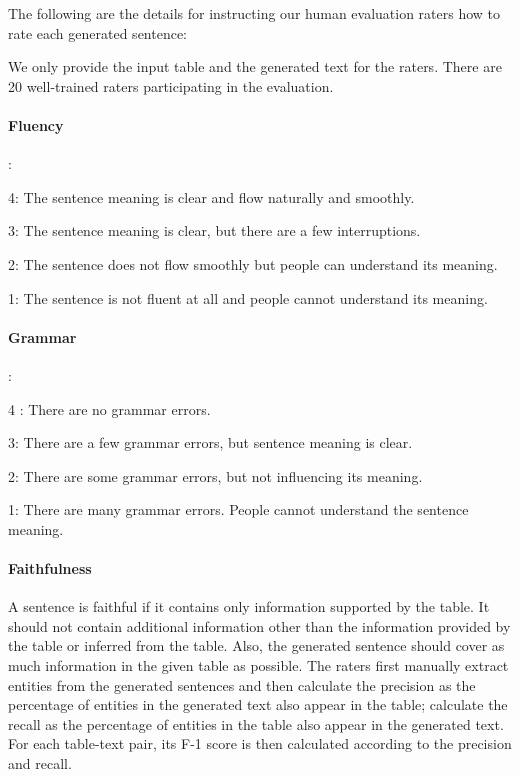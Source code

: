 \documentclass[11pt,a4paper]{article}
\begin{document}
The following are the details for instructing our human evaluation raters how to rate each generated sentence:

We only provide the input table and the generated text for the raters. There are 20 well-trained raters participating in the evaluation.

\paragraph{Fluency}:

4: The sentence meaning is clear and flow naturally and smoothly.

3: The sentence meaning is clear, but there are a few interruptions.

2: The sentence does not flow smoothly but people can understand its meaning.

1: The sentence is not fluent at all and people cannot understand its meaning.


\paragraph{Grammar}:

4 : There are no grammar errors.

3:  There are a few grammar errors, but sentence meaning is clear.

2:  There are some grammar errors, but not influencing its meaning.

1:  There are many grammar errors. People cannot understand the sentence meaning.


\paragraph{Faithfulness}

A sentence is faithful if it contains only information supported by the table. It should not contain additional information other than the information provided by the table or inferred from the table. Also, the generated sentence should cover as much information in the given table as possible. The raters first manually extract entities from the generated sentences and then calculate the precision as the percentage of entities in the generated text also appear in the table; calculate the recall as the percentage of entities in the table also appear in the generated text. For each table-text pair, its F-1 score is then calculated according to the precision and recall.
\end{document}

